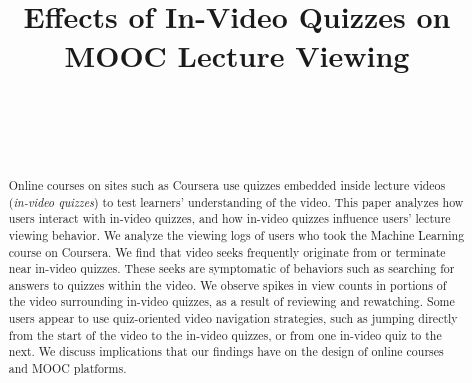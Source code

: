 \documentclass{sigchi}
\begin{document}
\title{Effects of In-Video Quizzes on MOOC Lecture Viewing}

\author{%
  \\
  \\
  \\
}

\maketitle

\begin{abstract}
Online courses on sites such as Coursera use quizzes embedded inside lecture videos (\textit{in-video quizzes}) to test learners' understanding of the video. This paper analyzes how users interact with in-video quizzes, and how in-video quizzes influence users' lecture viewing behavior. We analyze the viewing logs of users who took the Machine Learning course on Coursera. We find that video seeks frequently originate from or terminate near in-video quizzes. These seeks are symptomatic of behaviors such as searching for answers to quizzes within the video. We observe spikes in view counts in portions of the video surrounding in-video quizzes, as a result of reviewing and rewatching. Some users appear to use quiz-oriented video navigation strategies, such as jumping directly from the start of the video to the in-video quizzes, or from one in-video quiz to the next. We discuss implications that our findings have on the design of online courses and MOOC platforms. %
\end{abstract}
\end{document}
